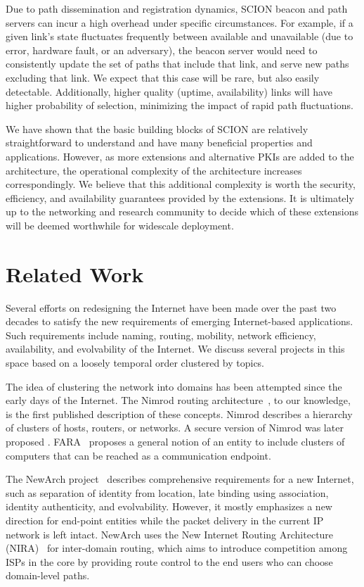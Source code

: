 \documentclass[a4paper]{llncs}
\newcommand\SCION{{\small\textsf{SCION}}\xspace}
\begin{document}
Due to path dissemination and registration dynamics, \SCION beacon and path servers can
incur a high overhead under specific circumstances. For example, if a given
link's state fluctuates frequently between available and unavailable (due to
error, hardware fault, or an adversary), the beacon server would need to
consistently update the set of paths that include that link, and serve new
paths excluding that link. We expect that this case will be rare, but also
easily detectable.  Additionally, higher quality (uptime, availability) links
will have higher probability of selection, minimizing the impact of rapid path
fluctuations.

We have shown that the basic building blocks of \SCION are relatively
straightforward to understand and have many beneficial properties and
applications. However, as more extensions and alternative PKIs
are added to the architecture, the operational complexity of
the architecture increases correspondingly. We believe that this additional
complexity is
worth the security, efficiency, and availability guarantees provided
by the extensions. It is ultimately up to the networking and research community
to decide which of these extensions will be deemed worthwhile for widescale deployment.

 

\section{Related Work}
\label{sec:related}

Several efforts on redesigning the Internet have been made over the past two
decades to satisfy the new requirements of emerging Internet-based
applications. Such requirements include naming, routing, mobility, network
efficiency, availability, and evolvability of the Internet. We discuss several
projects in this space based on a loosely temporal order clustered by topics.

The idea of clustering the network into domains has been attempted since the
early days of the Internet. The Nimrod routing architecture~\cite{rfc1992}, to
our knowledge, is the first published description of these concepts.  Nimrod
describes a hierarchy of clusters of hosts, routers, or networks. A secure
version of Nimrod was later proposed \cite{SirKen97}.  FARA~\cite{Clark03FARA}
proposes a general notion of an entity to include clusters of computers that
can be reached as a communication endpoint.


The NewArch project~\cite{Clark03FARA} describes comprehensive requirements for
a new Internet, such as separation of identity from location, late binding
using association, identity authenticity, and evolvability. However, it mostly
emphasizes a new direction for end-point entities while the packet delivery in
the current IP network is left intact.  NewArch uses the New Internet Routing
Architecture (NIRA)~\cite{YanClaBer2007} for inter-domain routing, which aims
to introduce competition among ISPs in the core by providing route control to
the end users who can choose domain-level paths.
\end{document}
